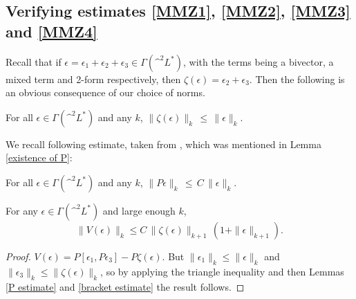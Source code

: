 \documentclass{article}
\begin{document}
\subsection{Verifying estimates \eqref{MMZ1}, \eqref{MMZ2}, \eqref{MMZ3} and \eqref{MMZ4}}

Recall that if $\epsilon = \epsilon_1 + \epsilon_2 + \epsilon_3 \in \Gamma(\^ ^2 L^*)$, with the terms being a bivector, a mixed term and 2-form respectively, then $\zeta(\epsilon) = \epsilon_2 + \epsilon_3$.  Then the following is an obvious consequence of our choice of norms.

\begin{lem}\label{projection estimate}
For all $\epsilon \in \Gamma(\^ ^2 L^*)$ and any $k$, $\|\zeta(\epsilon)\|_k \,\leq\, \|\epsilon\|_k$.
\end{lem}

We recall following estimate, taken from \cite{NijenhuisWoolf}, which was mentioned in Lemma \ref{existence of P}:
\begin{lem}\label{P estimate}
For all $\epsilon \in \Gamma(\^ ^2 L^*)$ and any $k$, $\|P\epsilon\|_k \,\leq\, C\,\|\epsilon\|_k$.
\end{lem}


\begin{lem}\label{V estimate}
For any $\epsilon \in \Gamma(\^ ^2 L^*)$ and large enough $k$,
$$\|V(\epsilon)\|_k \leq C\, \|\zeta(\epsilon)\|_{k+1}\, (1+\|\epsilon\|_{k+1}).$$
\end{lem}
\begin{proof}
$V(\epsilon) = P[\epsilon_1,P\epsilon_3] - P\zeta(\epsilon)$.  But $\|\epsilon_1\|_k \leq \|\epsilon\|_k$ and $\|\epsilon_3\|_k \leq \|\zeta(\epsilon)\|_k$, so by applying the triangle inequality and then Lemmas \ref{P estimate} and \ref{bracket estimate} the result follows.
\end{proof}
\end{document}
